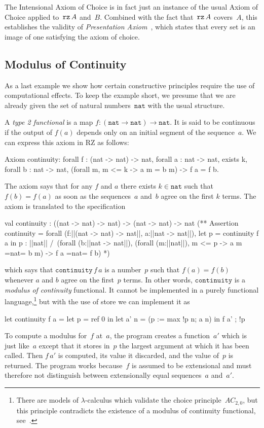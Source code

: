 The Intensional Axiom of Choice is in fact just an instance of the
usual Axiom of Choice applied to~$\texttt{rz}\,A$ and~$B$. Combined with the
fact that~$\texttt{rz}\,A$ covers~$A$, this establishes the validity of
\emph{Presentation Axiom}~\cite{barwise75:_admis_sets_struc}, which
states that every set is an image of one satisfying the axiom of
choice.

\subsection{Modulus of Continuity}
\label{sec:we-show-modulus-of-continuity-example}

As a last example we show how certain constructive principles require
the use of computational effects. To keep the example short, we
presume that we are already given the set of natural
numbers~$\mathtt{nat}$ with the usual structure.

A \emph{type 2 functional} is a map $f : (\mathtt{nat} \to \mathtt{nat})
\to \mathtt{nat}$. It is said to be continuous if the output of $f(a)$
depends only on an initial segment of the sequence~$a$. We can express
this axiom in RZ as follows:
%
\begin{source}
Axiom continuity:
forall f : (nat -> nat) -> nat, forall a : nat -> nat,
  exists k, forall b : nat -> nat,
    (forall m, m <= k -> a m = b m) -> f a = f b.
\end{source}
%
The axiom says that for any $f$ and $a$ there exists $k \in
\mathtt{nat}$ such that $f(b) = f(a)$ as soon as the sequences~$a$
and~$b$ agree on the first $k$ terms. The axiom is translated to the
specification
%
\begin{source}
val continuity : ((nat -> nat) -> nat) -> (nat -> nat) -> nat
(**  Assertion continuity =
forall (f:||(nat -> nat) -> nat||, a:||nat -> nat||),
  let p = continuity f a in p : ||nat|| /\
  (forall (b:||nat -> nat||),
     (forall (m:||nat||),  m <= p -> a m =nat= b m) -> f a =nat= f b)
*)
\end{source}
%
which says that $\mathtt{continuity}\,f\,a$ is a number~$p$ such that
$f(a) = f(b)$ whenever $a$ and $b$ agree on the first~$p$ terms. In
other words, $\mathtt{continuity}$ is a \emph{modulus of continuity}
functional. It cannot be implemented in a purely functional
language,\footnote{There are models of $\lambda$-calculus which validate
  the choice principle~$AC_{2,0}$, but this principle contradicts the
  existence of a modulus of continuity functional,
  see~\cite[9.6.10]{Troelstra:van-Dalen:88:2}.} but with the use of
store we can implement it as
%
\begin{source}
let continuity f a =
  let p = ref 0 in
  let a' n = (p := max !p n; a n) in
    f a' ; !p
\end{source}
%
To compute a modulus for~$f$ at~$a$, the program creates a
function~$a'$ which is just like~$a$ except that it stores in~$p$ the
largest argument at which it has been called. Then $f\,a'$ is
computed, its value it discarded, and the value of~$p$ is returned.
The program works because~$f$ is assumed to be extensional and must
therefore not distinguish between extensionally equal sequences~$a$
and~$a'$.



